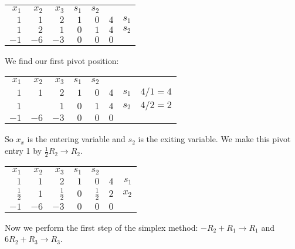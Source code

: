 \documentclass[11pt,letterpaper]{article}
\begin{document}
	\begin{table}[!ht]
	\centering
	\begin{tabular}{rrrrrr r}
	{\small $x_1$} & {\small $x_2$} & {\small $x_3$} & {\small $s_1$} & {\small $s_2$} \\
	$1$ & $1$ & $2$ & $1$ & \multicolumn{1}{r|}{$0$} & $4$ & {\small $s_1$} \\
	$1$ & $2$ & $1$ & $0$ & \multicolumn{1}{r|}{$1$} & $4$ & {\small $s_2$} \\ \cline{1-6}
	$-1$ & $-6$ & $-3$ & $0$ & \multicolumn{1}{r|}{$0$} & $0$ 
	\end{tabular}
	\end{table}

We find our first pivot position: 

	\begin{table}[!ht]
	\centering
	\begin{tabular}{rrrrrr rr}
	{\small $x_1$} & {\small $x_2$} & {\small $x_3$} & {\small $s_1$} & {\small $s_2$} \\
	$1$ & $1$ & $2$ & $1$ & \multicolumn{1}{r|}{$0$} & $4$ & {\small $s_1$} & {\small $4/1= 4$}\\
	$1$ & \fbox{$2$} & $1$ & $0$ & \multicolumn{1}{r|}{$1$} & $4$ & {\small $s_2$} & {\small $4/2= 2$}\\ \cline{1-6}
	$-1$ & \underline{$-6$} & $-3$ & $0$ & \multicolumn{1}{r|}{$0$} & $0$ 
	\end{tabular}
	\end{table}

So $x_x$ is the entering variable and $s_2$ is the exiting variable. We make this pivot entry 1 by $\frac{1}{2}R_2 \to R_2$. 

	\begin{table}[!ht]
	\centering
	\begin{tabular}{rrrrrr r}
	{\small $x_1$} & {\small $x_2$} & {\small $x_3$} & {\small $s_1$} & {\small $s_2$} \\
	$1$ & $1$ & $2$ & $1$ & \multicolumn{1}{r|}{$0$} & $4$ & {\small $s_1$} \\
	$\frac{1}{2}$ & $1$ & $\frac{1}{2}$ & $0$ & \multicolumn{1}{r|}{$\frac{1}{2}$} & $2$ & {\small $x_2$} \\ \cline{1-6}
	$-1$ & $-6$ & $-3$ & $0$ & \multicolumn{1}{r|}{$0$} & $0$ 
	\end{tabular}
	\end{table}

Now we perform the first step of the simplex method: $-R_2 + R_1 \to R_1$ and $6R_2 + R_3 \to R_3$. 
\end{document}
